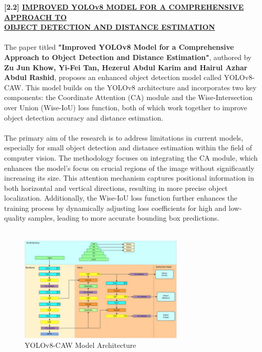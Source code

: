 { \textbf{[2.2] \underline{IMPROVED YOLOv8 MODEL FOR A COMPREHENSIVE APPROACH TO } \\ \underline{OBJECT DETECTION AND DISTANCE ESTIMATION} }
\\\\
%
The paper titled \textbf{"Improved YOLOv8 Model for a Comprehensive Approach to Object Detection and Distance Estimation"}, authored by \textbf{Zu Jun Khow, Yi-Fei Tan, Hezerul Abdul Karim and Hairul Azhar Abdul Rashid}, proposes an enhanced object detection model called YOLOv8-CAW. This model builds on the YOLOv8 architecture and incorporates two key components: the Coordinate Attention (CA) module and the Wise-Intersection over Union (Wise-IoU) loss function, both of which work together to improve object detection accuracy and distance estimation.\\\\
%
The primary aim of the research is to address limitations in current models, especially for small object detection and distance estimation within the field of computer vision. The methodology focuses on integrating the CA module, which enhances the model’s focus on crucial regions of the image without significantly increasing its size. This attention mechanism captures positional information in both horizontal and vertical directions, resulting in more precise object localization. Additionally, the Wise-IoU loss function further enhances the training process by dynamically adjusting loss coefficients for high and low-quality samples, leading to more accurate bounding box predictions.\\\\
%
%  
% 
\begin{figure}[h!]
    \centering
    \includegraphics[width=0.7\textwidth]{images/YOLOv8 CAW Architecture.png}
    \caption{YOLOv8-CAW Model Architecture}
\end{figure}\\\\
}
